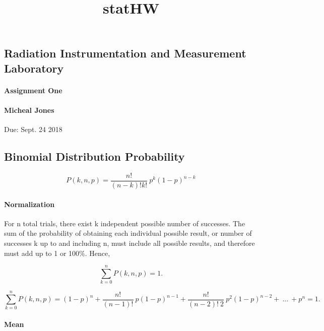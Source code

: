 \documentclass[11pt]{article}
\title{statHW}
\begin{document}
    
    
    \maketitle
    
    

    
    \subsection{Radiation Instrumentation and Measurement
Laboratory}\label{radiation-instrumentation-and-measurement-laboratory}

\paragraph{Assignment One}\label{assignment-one}

\paragraph{Micheal Jones}\label{micheal-jones}

Due: Sept. 24 2018

    \subsection{Binomial Distribution
Probability}\label{binomial-distribution-probability}

\[ P(k,n,p) = \frac{n ! }{(n-k) ! k !} \ p^{k} (1-p)^{n-k} \]

\paragraph{Normalization}\label{normalization}

For n total trials, there exist k independent possible number of
successes. The sum of the probability of obtaining each individual
possible result, or number of successes k up to and including n, must
include all possible results, and therefore must add up to 1 or 100\%.
Hence,

\[ \sum_{k=0}^{n} P(k, n, p) = 1 . \]

\[ \sum_{k=0}^{n} P(k, n, p) = (1-p)^n + \frac{n ! }{(n-1) !} \ p (1-p)^{n-1} + \frac{n ! }{(n-2) ! \ 2} \ p^2 (1-p)^{n-2} + \ ... \ + p^{n} = 1 . \]

\paragraph{Mean}\label{mean}
\end{document}
